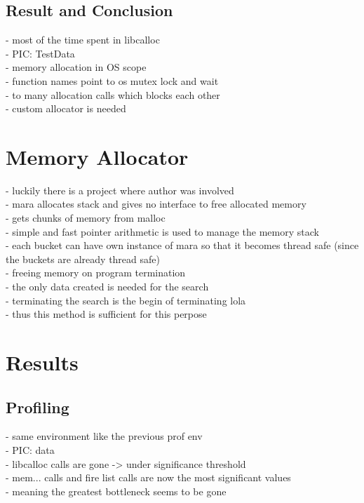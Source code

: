 \subsection{Result and Conclusion}
- most of the time spent in libcalloc\\
- PIC: TestData\\
- memory allocation in OS scope\\
- function names point to os mutex lock and wait\\
- to many allocation calls which blocks each other\\
- custom allocator is needed\\

\section{Memory Allocator}
- luckily there is a project where author was involved\\
- mara allocates stack and gives no interface to free allocated memory\\
- gets chunks of memory from malloc\\
- simple and fast pointer arithmetic is used to manage the memory stack\\
- each bucket can have own instance of mara so that it becomes thread safe (since the buckets are already thread safe)\\
- freeing memory on program termination\\
- the only data created is needed for the search\\
- terminating the search is the begin of terminating lola\\
- thus this method is sufficient for this perpose\\ 

\section{Results}
\subsection{Profiling}
- same environment like the previous prof env\\
- PIC: data\\
- libcalloc calls are gone -> under significance threshold\\
- mem... calls and fire list calls are now the most significant values\\
- meaning the greatest bottleneck seems to be gone\\

